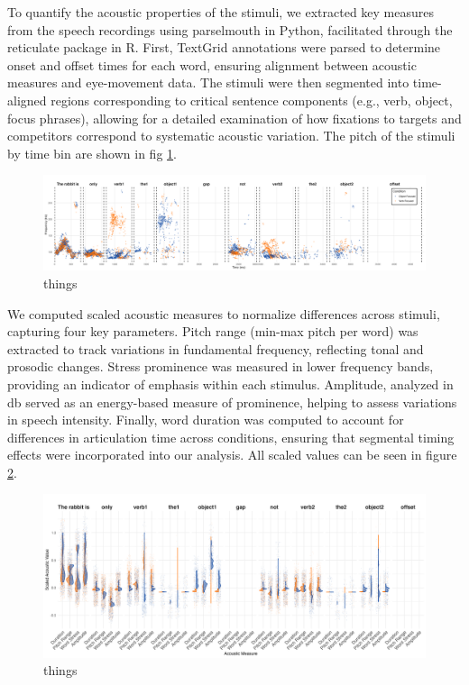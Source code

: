To quantify the acoustic properties of the stimuli, we extracted key measures from the speech recordings using parselmouth \citep{Boersma2022} in Python, facilitated through the reticulate package \citep{Ushey2022} in R. First, TextGrid annotations were parsed to determine onset and offset times for each word, ensuring alignment between acoustic measures and eye-movement data. The stimuli were then segmented into time-aligned regions corresponding to critical sentence components (e.g., verb, object, focus phrases), allowing for a detailed examination of how fixations to targets and competitors correspond to systematic acoustic variation. The pitch of the stimuli by time bin are shown in fig \ref{fig:acoustic}.

\begin{figure}[H]  %
    \centering
    \includegraphics[width=\textwidth,height=\textheight,keepaspectratio]{viz/accoustic.png}
    \caption{things}
    \label{fig:acoustic}
\end{figure}

We computed scaled acoustic measures to normalize differences across stimuli, capturing four key parameters. Pitch range (min-max pitch per word) was extracted to track variations in fundamental frequency, reflecting tonal and prosodic changes. Stress prominence was measured in lower frequency bands, providing an indicator of emphasis within each stimulus. Amplitude, analyzed in db served as an energy-based measure of prominence, helping to assess variations in speech intensity. Finally, word duration was computed to account for differences in articulation time across conditions, ensuring that segmental timing effects were incorporated into our analysis. All scaled values can be seen in figure \ref{fig:acoustic_faceted}.

\begin{figure}[H]  %
    \centering
    \includegraphics[width=\textwidth,height=\textheight,keepaspectratio]{viz/acoustic_faceted.png}
    \caption{things}
    \label{fig:acoustic_faceted}
\end{figure}


